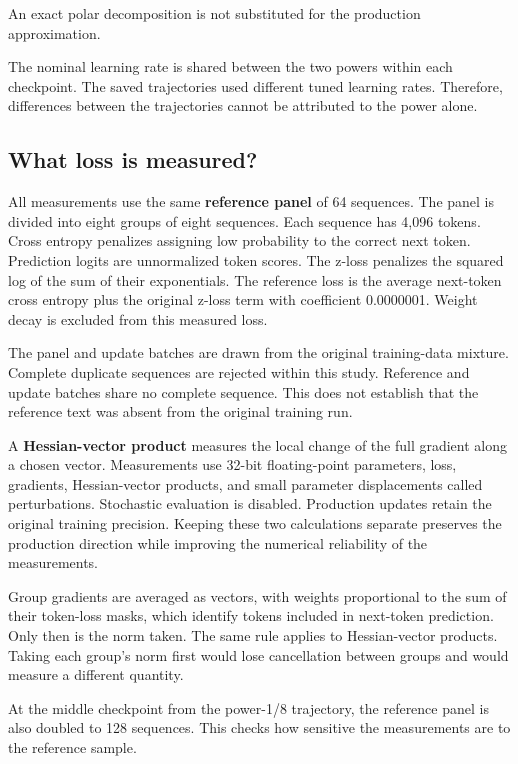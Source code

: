 \documentclass[
  14pt,
  letterpaper,
]{extarticle}
\begin{document}
An exact polar decomposition is not substituted for the production
approximation.

The nominal learning rate is shared between the two powers within each
checkpoint. The saved trajectories used different tuned learning rates.
Therefore, differences between the trajectories cannot be attributed to
the power alone.

\subsection{What loss is measured?}\label{what-loss-is-measured}

All measurements use the same \textbf{reference panel} of 64 sequences.
The panel is divided into eight groups of eight sequences. Each sequence
has 4,096 tokens. Cross entropy penalizes assigning low probability to
the correct next token. Prediction logits are unnormalized token scores.
The z-loss penalizes the squared log of the sum of their exponentials.
The reference loss is the average next-token cross entropy plus the
original z-loss term with coefficient 0.0000001. Weight decay is
excluded from this measured loss.

The panel and update batches are drawn from the original training-data
mixture. Complete duplicate sequences are rejected within this study.
Reference and update batches share no complete sequence. This does not
establish that the reference text was absent from the original training
run.

A \textbf{Hessian-vector product} measures the local change of the full
gradient along a chosen vector. Measurements use 32-bit floating-point
parameters, loss, gradients, Hessian-vector products, and small
parameter displacements called perturbations. Stochastic evaluation is
disabled. Production updates retain the original training precision.
Keeping these two calculations separate preserves the production
direction while improving the numerical reliability of the measurements.

Group gradients are averaged as vectors, with weights proportional to
the sum of their token-loss masks, which identify tokens included in
next-token prediction. Only then is the norm taken. The same rule
applies to Hessian-vector products. Taking each group's norm first would
lose cancellation between groups and would measure a different quantity.

At the middle checkpoint from the power-1/8 trajectory, the reference
panel is also doubled to 128 sequences. This checks how sensitive the
measurements are to the reference sample.
\end{document}
